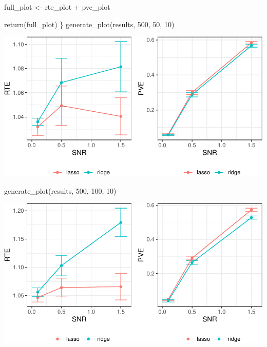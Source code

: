 \documentclass[
  letterpaper,
]{latex/krantz}
\makeatletter
\newenvironment{Shaded}{\begin{snugshade}}{\end{snugshade}}
\newcommand{\DecValTok}[1]{\textcolor[rgb]{0.68,0.00,0.00}{#1}}
\newcommand{\FunctionTok}[1]{\textcolor[rgb]{0.28,0.35,0.67}{#1}}
\newcommand{\NormalTok}[1]{\textcolor[rgb]{0.00,0.23,0.31}{#1}}
\newcommand{\OtherTok}[1]{\textcolor[rgb]{0.00,0.23,0.31}{#1}}
\newcommand{\SpecialCharTok}[1]{\textcolor[rgb]{0.37,0.37,0.37}{#1}}
\newenvironment{kframe}{%
\medskip{}
\setlength{\fboxsep}{.8em}
 \def\at@end@of@kframe{}%
 \ifinner\ifhmode%
  \def\at@end@of@kframe{\end{minipage}}%
  \begin{minipage}{\columnwidth}%
 \fi\fi%
 \def\FrameCommand##1{\hskip\@totalleftmargin \hskip-\fboxsep
 \colorbox{shadecolor}{##1}\hskip-\fboxsep
     \hskip-\linewidth \hskip-\@totalleftmargin \hskip\columnwidth}%
 \MakeFramed {\advance\hsize-\width
   \@totalleftmargin\z@ \linewidth\hsize
   \@setminipage}}%
 {\par\unskip\endMakeFramed%
 \at@end@of@kframe}
\renewenvironment{Shaded}{\begin{kframe}}{\end{kframe}}
\makeatother
\begin{document}
\begin{Shaded}
\begin{Highlighting}[]
\NormalTok{  full\_plot }\OtherTok{\textless{}{-}}\NormalTok{ rte\_plot }\SpecialCharTok{+}\NormalTok{ pve\_plot }
  
  \FunctionTok{return}\NormalTok{(full\_plot)}
\NormalTok{\}}
\FunctionTok{generate\_plot}\NormalTok{(results, }\DecValTok{500}\NormalTok{, }\DecValTok{50}\NormalTok{, }\DecValTok{10}\NormalTok{)}
\end{Highlighting}
\end{Shaded}

\begin{center}
\includegraphics[width=1\textwidth,height=\textheight]{book/cs_simulation_files/figure-pdf/unnamed-chunk-8-1.pdf}
\end{center}

\begin{Shaded}
\begin{Highlighting}[]
\FunctionTok{generate\_plot}\NormalTok{(results, }\DecValTok{500}\NormalTok{, }\DecValTok{100}\NormalTok{, }\DecValTok{10}\NormalTok{)}
\end{Highlighting}
\end{Shaded}

\begin{center}
\includegraphics[width=1\textwidth,height=\textheight]{book/cs_simulation_files/figure-pdf/unnamed-chunk-9-1.pdf}
\end{center}
\end{document}
